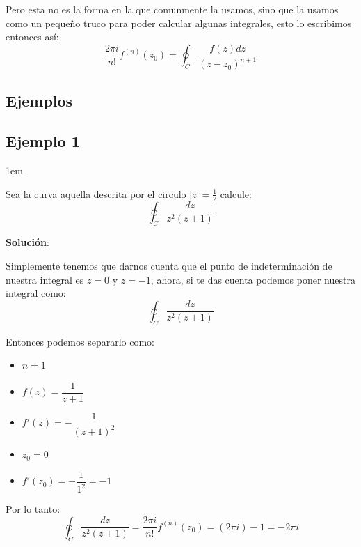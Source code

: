 \documentclass[12pt, fleqn]{report}                             %
\newenvironment{SmallIndentation}[1][0.75em]                    %
    {\begin{adjustwidth}{#1}{}\begin{footnotesize}}                 %
    {\end{footnotesize}\end{adjustwidth}}                           %
\begin{document}
            Pero esta no es la forma en la que comunmente la usamos, sino que la usamos
            como un pequeño truco para poder calcular algunas integrales,
            esto lo escribimos entonces así:
            \begin{equation*}
                \dfrac{2 \pi i}{n!}f^{(n)}(z_0) = \oint_C \dfrac{f(z) dz}{(z-z_0)^{n+1}}
            \end{equation*}
                
            \subsection{Ejemplos}

                \subsection*{Ejemplo 1}
                \begin{SmallIndentation}[1em]


                    Sea la curva aquella descrita por el circulo $|z|=\frac{1}{2}$
                    calcule:
                    \begin{equation*}
                        \oint_C \dfrac{dz}{z^2(z+1)}
                    \end{equation*}

                    \textbf{Solución}:

                    Simplemente tenemos que darnos cuenta que el punto de indeterminación de
                    nuestra integral es $z=0$ y $z=-1$, ahora, si te das cuenta podemos poner
                    nuestra integral como:
                    \begin{equation*}
                        \oint_C \dfrac{dz}{z^2(z+1)}
                    \end{equation*}

                    Entonces podemos separarlo como:
                    \begin{itemize}
                        \item $n=1$
                        \item $f(z) = \dfrac{1}{z+1}$
                        \item $f'(z) = -\dfrac{1}{(z+1)^2}$
                        \item $z_0 = 0$
                        \item $f'(z_0) = -\dfrac{1}{1^2} = -1$
                    \end{itemize}

                    Por lo tanto:
                    \begin{equation*}
                        \oint_C \dfrac{dz}{z^2(z+1)} 
                            = \dfrac{2 \pi i}{n!}f^{(n)}(z_0)
                            = (2 \pi i) -1
                            = -2 \pi i
                    \end{equation*}

                \end{SmallIndentation}
\end{document}
